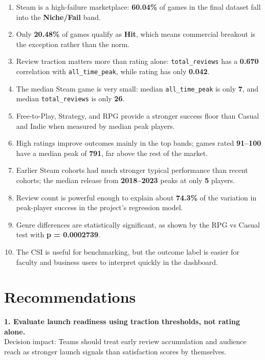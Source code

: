 \documentclass[12pt,a4paper]{report}
\begin{document}
\begin{enumerate}
\item Steam is a high-failure marketplace: \textbf{60.04\%} of games in the final dataset fall into the \textbf{Niche/Fail} band.
\item Only \textbf{20.48\%} of games qualify as \textbf{Hit}, which means commercial breakout is the exception rather than the norm.
\item Review traction matters more than rating alone: \texttt{total\_reviews} has a \textbf{0.670} correlation with \texttt{all\_time\_peak}, while rating has only \textbf{0.042}.
\item The median Steam game is very small: median \texttt{all\_time\_peak} is only \textbf{7}, and median \texttt{total\_reviews} is only \textbf{26}.
\item Free-to-Play, Strategy, and RPG provide a stronger success floor than Casual and Indie when measured by median peak players.
\item High ratings improve outcomes mainly in the top bands; games rated \textbf{91--100} have a median peak of \textbf{791}, far above the rest of the market.
\item Earlier Steam cohorts had much stronger typical performance than recent cohorts; the median release from \textbf{2018--2023} peaks at only \textbf{5} players.
\item Review count is powerful enough to explain about \textbf{74.3\%} of the variation in peak-player success in the project's regression model.
\item Genre differences are statistically significant, as shown by the RPG vs Casual test with \textbf{p = 0.0002739}.
\item The CSI is useful for benchmarking, but the outcome label is easier for faculty and business users to interpret quickly in the dashboard.
\end{enumerate}

\chapter{Recommendations}

\textbf{1. Evaluate launch readiness using traction thresholds, not rating alone.}\\
Decision impact: Teams should treat early review accumulation and audience reach as stronger launch signals than satisfaction scores by themselves.
\end{document}
